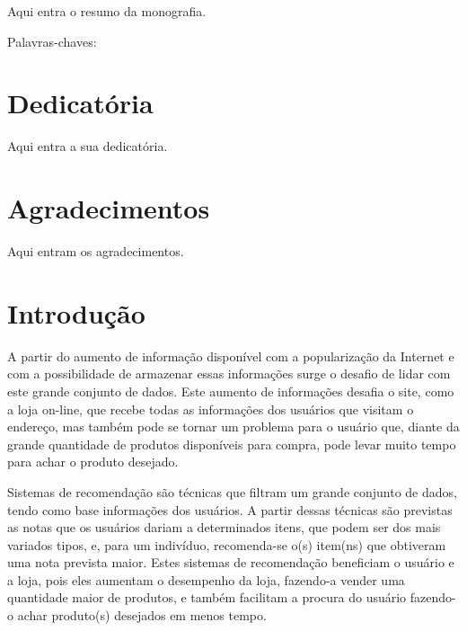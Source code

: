 \documentclass[12pt,a4paper,header]{abnt}
\begin{document}
\begin{resumo}
Aqui entra o resumo da monografia.

\vspace{1cm}
\noindent Palavras-chaves: 


\end{resumo}



\chapter*{Dedicatória}
Aqui entra a sua dedicatória. 



\chapter*{Agradecimentos}
Aqui entram os agradecimentos. 



\tableofcontents{}
\listoffigures
\listoftables



\chapter{Introdução} \label{cap:introducao}

A partir do aumento de informação disponível com a popularização da Internet e com a possibilidade de armazenar essas informações surge o desafio de lidar com este grande conjunto de dados\cite{isinkaye2015recommendation}. Este aumento de informações desafia o site, como a loja on-line, que recebe todas as informações dos usuários que visitam o endereço, mas também pode se tornar um problema para o usuário que, diante da grande quantidade de produtos disponíveis para compra, pode levar muito tempo para achar o produto desejado\cite{mild2002collaborative}.

Sistemas de recomendação são técnicas que filtram um grande conjunto de dados, tendo como base informações dos usuários\cite{takahashi2015estudo}. A partir dessas técnicas são previstas as notas que os usuários dariam a determinados itens, que podem ser dos mais variados tipos, e, para um indivíduo, recomenda-se o(s) item(ns) que obtiveram uma nota prevista maior\cite{shapira2011recommender}. Estes sistemas de recomendação beneficiam o usuário e a loja, pois eles aumentam o desempenho da loja, fazendo-a vender uma quantidade maior de produtos, e também facilitam a procura do usuário fazendo-o achar produto(s) desejados em menos tempo\cite{isinkaye2015recommendation}.
\end{document}
